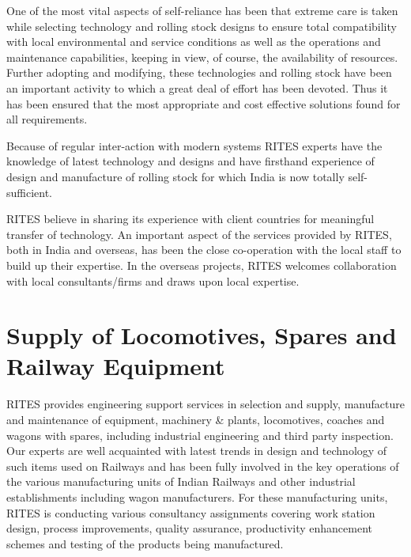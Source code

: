 \bigskip

{\color[rgb]{0.0,0.0,0.039215688}
One of the most vital aspects of self-reliance has been that extreme care is taken while selecting technology and
rolling stock designs to ensure total compatibility with local environmental and service conditions as well as the
operations and maintenance capabilities, keeping in view, of course, the availability of resources. Further adopting
and modifying, these technologies and rolling stock have been an important activity to which a great deal of effort has
been devoted. Thus it has been ensured that the most appropriate and cost effective solutions found for all
requirements.}


\bigskip

{\color[rgb]{0.0,0.0,0.039215688}
Because of regular inter-action with modern systems RITES experts have the knowledge of latest technology and designs
and have firsthand experience of design and manufacture of rolling stock for which India is now totally
self-sufficient.}


\bigskip

{\color[rgb]{0.0,0.0,0.039215688}
RITES believe in sharing its experience with client countries for meaningful transfer of technology. An important aspect
of the services provided by RITES, both in India and overseas, has been the close co-operation with the local staff to
build up their expertise. In the overseas projects, RITES welcomes collaboration with local consultants/firms and draws
upon local expertise.}


\bigskip


\section{Supply of Locomotives, Spares and Railway Equipment}


\bigskip

{\color[rgb]{0.0,0.0,0.039215688}
RITES provides engineering support services in selection and supply, manufacture and maintenance of equipment, machinery
\& plants, locomotives, coaches and wagons with spares, including industrial engineering and third party inspection.
Our experts are well acquainted with latest trends in design and technology of such items used on Railways and has been
fully involved in the key operations of the various manufacturing units of Indian Railways and other industrial
establishments including wagon manufacturers. For these manufacturing units, RITES is conducting various consultancy
assignments covering work station design, process improvements, quality assurance, productivity enhancement schemes and
testing of the products being manufactured.}


